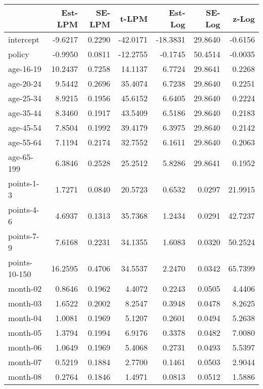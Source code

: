 \documentclass[10pt]{article}
\begin{document}

\begin{table}[ht]
\centering
\begin{tabular}{lrrrrrr}
  \hline
 & Est-LPM & SE-LPM & t-LPM & Est-Log & SE-Log & z-Log \\ 
  \hline
intercept & -9.6217 & 0.2290 & -42.0171 & -18.3831 & 29.8640 & -0.6156 \\ 
  policy & -0.9950 & 0.0811 & -12.2755 & -0.1745 & 50.4514 & -0.0035 \\ 
  age-16-19 & 10.2437 & 0.7258 & 14.1137 & 6.7724 & 29.8641 & 0.2268 \\ 
  age-20-24 & 9.5442 & 0.2696 & 35.4074 & 6.7238 & 29.8640 & 0.2251 \\ 
  age-25-34 & 8.9215 & 0.1956 & 45.6152 & 6.6405 & 29.8640 & 0.2224 \\ 
  age-35-44 & 8.3460 & 0.1917 & 43.5409 & 6.5186 & 29.8640 & 0.2183 \\ 
  age-45-54 & 7.8504 & 0.1992 & 39.4179 & 6.3975 & 29.8640 & 0.2142 \\ 
  age-55-64 & 7.1194 & 0.2174 & 32.7552 & 6.1611 & 29.8640 & 0.2063 \\ 
  age-65-199 & 6.3846 & 0.2528 & 25.2512 & 5.8286 & 29.8641 & 0.1952 \\ 
  points-1-3 & 1.7271 & 0.0840 & 20.5723 & 0.6532 & 0.0297 & 21.9915 \\ 
  points-4-6 & 4.6937 & 0.1313 & 35.7368 & 1.2434 & 0.0291 & 42.7237 \\ 
  points-7-9 & 7.6168 & 0.2231 & 34.1355 & 1.6083 & 0.0320 & 50.2524 \\ 
  points-10-150 & 16.2595 & 0.4706 & 34.5537 & 2.2470 & 0.0342 & 65.7399 \\ 
  month-02 & 0.8646 & 0.1962 & 4.4072 & 0.2243 & 0.0505 & 4.4406 \\ 
  month-03 & 1.6522 & 0.2002 & 8.2547 & 0.3948 & 0.0478 & 8.2625 \\ 
  month-04 & 1.0081 & 0.1969 & 5.1207 & 0.2601 & 0.0494 & 5.2638 \\ 
  month-05 & 1.3794 & 0.1994 & 6.9176 & 0.3378 & 0.0482 & 7.0080 \\ 
  month-06 & 1.0649 & 0.1969 & 5.4068 & 0.2731 & 0.0493 & 5.5397 \\ 
  month-07 & 0.5219 & 0.1884 & 2.7700 & 0.1461 & 0.0503 & 2.9044 \\ 
  month-08 & 0.2764 & 0.1846 & 1.4971 & 0.0813 & 0.0512 & 1.5886 \\ 

\end{tabular}
\end{table}
\end{document}
